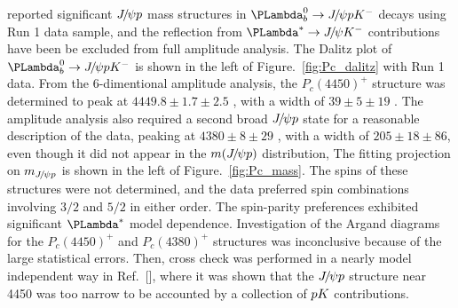 \lhcb reported significant ${{J\mskip -3mu/\mskip -2mu\psi}}{p}$ mass structures in $\Lb\to\jpsi\proton\Km$ decays using Run 1 data sample,
and the reflection from $\Lz^{*}\to\jpsi\Km$ contributions have 
been be excluded from full amplitude analysis\supercite{LHCb-PAPER-2015-029}.
The Dalitz plot of $\Lb\to\jpsi\proton\Km$ is shown in the left of Figure.~\ref{fig:Pc_dalitz} with Run 1 data.
From the 6-dimentional amplitude analysis,
the $P_{c}(4450)^{+}$ structure was determined to peak at $4449.8\pm 1.7\pm 2.5$ \mev,
with a width of $39\pm 5\pm 19$ \mev.
The amplitude analysis also required a second broad ${{J\mskip -3mu/\mskip -2mu\psi}}{p}$ state for a reasonable description of the data,
peaking at $4380\pm 8\pm 29$ \mev,
with a width of $205\pm18\pm86$\mev,
even though it did not appear in the $m({{J\mskip -3mu/\mskip -2mu\psi}}{p})$ distribution,
The fitting projection on $m_{{{J\mskip -3mu/\mskip -2mu\psi}}{p}}$ is shown in the left of Figure.~\ref{fig:Pc_mass}.
The spins of these structures were not determined,
and the data preferred spin combinations involving $3/2$ and $5/2$ in either order.
The spin-parity preferences exhibited significant $\Lz^{*}$ model dependence.
Investigation of the Argand diagrams for the $P_{c}(4450)^{+}$ and $P_{c}(4380)^{+}$ structures was inconclusive
because of the large statistical errors.
Then, 
cross check was performed in a nearly model independent way in Ref.~[\cite{LHCb-PAPER-2016-009}],
where it was shown that the ${{J\mskip -3mu/\mskip -2mu\psi}}{p}$ structure near 4450\mev 
was too narrow to be accounted by a collection of ${p}{K}$ contributions.

